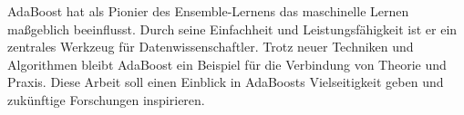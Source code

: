 AdaBoost hat als Pionier des Ensemble-Lernens das maschinelle Lernen maßgeblich beeinflusst. Durch seine Einfachheit
und Leistungsfähigkeit ist er ein zentrales Werkzeug für Datenwissenschaftler. Trotz neuer Techniken und Algorithmen
bleibt AdaBoost ein Beispiel für die Verbindung von Theorie und Praxis. Diese Arbeit soll einen Einblick in AdaBoosts
Vielseitigkeit geben und zukünftige Forschungen inspirieren.